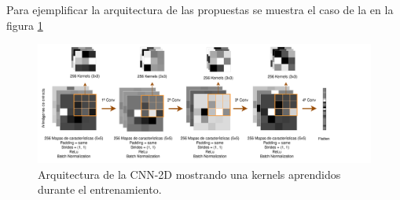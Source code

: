 \begin{enumerate}
                Para ejemplificar la arquitectura de las  propuestas se muestra el caso de la  en la figura \ref{TASPCNNIMAGE}


                \begin{figure}[h]
                    \centering
                    \includegraphics[width=17cm]{archivos/4.Metodologia/Modelos/CNN/2D/TASPCNN}
                    \caption{Arquitectura de la CNN-2D mostrando una  kernels aprendidos durante el entrenamiento.}
                    \label{TASPCNNIMAGE}
                 \end{figure}


        \end{enumerate}

        \cite{AutoSklearn}

\newpage
